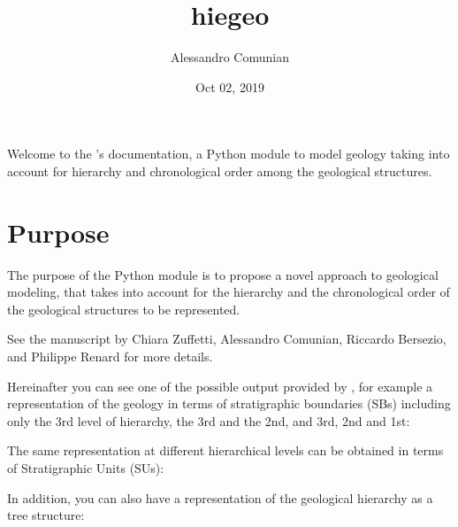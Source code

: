 \documentclass[letterpaper,10pt,english]{sphinxmanual}
\title{hiegeo}
\date{Oct 02, 2019}
\author{Alessandro Comunian}
\begin{document}
\pagestyle{empty}
\sphinxmaketitle
\pagestyle{plain}
\sphinxtableofcontents
\pagestyle{normal}
\label{\detokenize{index::doc}}


Welcome to the ’s documentation, a Python module to model
geology taking into account for hierarchy and chronological order
among the geological structures.


\chapter{Purpose}
\label{\detokenize{purpose:purpose}}\label{\detokenize{purpose::doc}}
The purpose of the  Python module is to propose a novel
approach to geological modeling, that takes into account for the
hierarchy and the chronological order of the geological structures to
be represented.

See the manuscript  by Chiara Zuffetti, Alessandro
Comunian, Riccardo Bersezio, and Philippe Renard for more details.

Hereinafter you can see one of the possible output provided by
, for example a representation of the geology in terms of
stratigraphic boundaries (SBs) including only the 3rd level of hierarchy, the 3rd and the 2nd, and 3rd, 2nd and 1st:

\noindent{}

\noindent{}

\noindent{}

The same representation at different hierarchical levels can be obtained in terms of Stratigraphic Units (SUs):

\noindent{}

\noindent{}

\noindent{}

In addition, you can also have a representation of the geological hierarchy as a tree structure:
\end{document}
